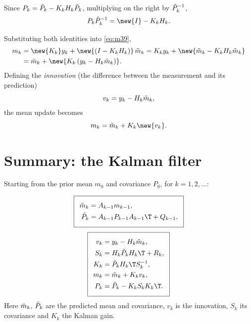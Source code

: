  Since $P_k = \tilde P_k - K_kH_k\tilde P_k$, multiplying on the right by $\tilde P_k^{-1}$,
\begin{equation}
  P_k\Pt_k^{-1} = \new{I} - K_kH_k.
\end{equation}

 Substituting both identities into \eqref{eq:m39},
\begin{equation}
  \begin{aligned}
  m_k &= \new{K_k}y_k + \new{(I - K_kH_k)}\,\mt_k = K_ky_k + \new{\mt_k - K_kH_k\mt_k} \\
  &= \mt_k + \new{K_k\left(y_k - H_k\mt_k\right)}.
  \end{aligned}
\end{equation}
Defining the \emph{innovation} (the difference between the measurement and its prediction)
\begin{equation}
  v_k = y_k - H_k\tilde m_k,
\end{equation}
the mean update becomes
\begin{equation}
  m_k = \mt_k + K_k\new{v_k}.
\end{equation}

\section{Summary: the Kalman filter}
Starting from the prior mean $m_0$ and covariance $P_0$, for $k = 1, 2, \dots$:

\begin{equation}
  \setlength{\fboxsep}{8pt}\fbox{$\displaystyle\begin{aligned}
    \mt_k &= A_{k-1}m_{k-1},\\
    \Pt_k &= A_{k-1}P_{k-1}A_{k-1}\T + Q_{k-1}.
  \end{aligned}$}
\end{equation}
\begin{equation}
  \setlength{\fboxsep}{8pt}\fbox{$\displaystyle\begin{aligned}
    v_k &= y_k - H_k\mt_k,\\
    S_k &= H_k\Pt_kH_k\T + R_k,\\
    K_k &= \Pt_kH_k\T S_k^{-1},\\
    m_k &= \mt_k + K_kv_k,\\
    P_k &= \Pt_k - K_kS_kK_k\T.
  \end{aligned}$}
\end{equation}
Here $\tilde m_k$, $\tilde P_k$ are the predicted mean and covariance, $v_k$ is the innovation, $S_k$ its covariance and $K_k$ the Kalman gain.

